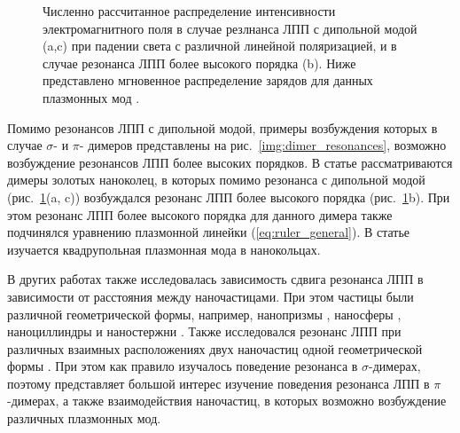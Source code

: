 \begin{figure}
\caption{Численно рассчитанное распределение интенсивности электромагнитного поля в случае резлнанса ЛПП с дипольной модой (a,c) при падении света с различной линейной поляризацией, и в случае резонанса ЛПП более высокого порядка (b). Ниже представлено мгновенное распределение зарядов для данных плазмонных мод \cite{nanoring}.}
\label{img:high-order_res}
\end{figure}
Помимо резонансов ЛПП с дипольной модой, примеры возбуждения которых в случае $ \sigma $-  и $ \pi $- димеров представлены на рис.~\ref{img:dimer_resonances}, возможно возбуждение резонансов ЛПП более высоких порядков. В статье \cite{nanoring} рассматриваются димеры золотых наноколец, в которых помимо резонанса с дипольной модой (рис.~\ref{img:high-order_res}(a, c)) возбуждался резонанс ЛПП более высокого порядка (рис.~\ref{img:high-order_res}b). При этом резонанс ЛПП более высокого порядка для данного димера также подчинялся уравнению плазмонной линейки (\ref{eq:ruler_general}). В статье \cite{diffractionCoupling} изучается квадрупольная плазмонная мода в нанокольцах.

В других работах также исследовалась зависимость сдвига резонанса ЛПП в зависимости от расстояния между наночастицами. При этом частицы были различной геометрической формы, например, нанопризмы \cite{nanoprism, nanoshells}, наносферы \cite{nanospheres, nanospheres2}, наноциллиндры \cite{nanocyllinders} и наностержни \cite{nanorods}. Также исследовался резонанс ЛПП при различных взаимных расположениях двух наночастиц одной геометрической формы \cite{nanorods2, nanorods3, 3druler}. При этом как правило изучалось поведение резонанса в $ \sigma$-димерах, поэтому представляет большой интерес изучение поведения резонанса ЛПП в $ \pi$-димерах, а также взаимодействия наночастиц, в которых возможно возбуждение различных плазмонных мод. 